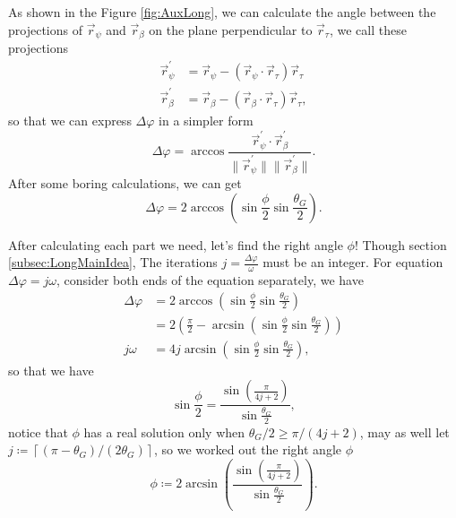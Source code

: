 \documentclass[a4paper,10pt]{book}
\numberwithin{equation}{section}
\begin{document}
As shown in the Figure \ref{fig:AuxLong}, we can calculate the angle between the projections of $\vec{r}_{\psi}$ and $\vec{r}_{\beta}$ on the plane perpendicular to $\vec{r}_{\tau}$, we call these projections
\begin{equation}
    \begin{split}
        \vec{r}_{\psi}^{'}  & =\vec{r}_{\psi}-(\vec{r}_{\psi}\cdot\vec{r}_{\tau})\vec{r}_{\tau}    \\
        \vec{r}_{\beta}^{'} & =\vec{r}_{\beta}-(\vec{r}_{\beta}\cdot\vec{r}_{\tau})\vec{r}_{\tau},
    \end{split}
\end{equation}
so that we can express $\Delta\varphi$ in a simpler form
\begin{equation}
    \Delta\varphi=\arccos\frac{\vec{r}_{\psi}^{'}\cdot\vec{r}_{\beta}^{'}}{\|\vec{r}_{\psi}^{'}\|\|\vec{r}_{\beta}^{'}\|}.
\end{equation}
After some boring calculations, we can get
\begin{equation}
    \Delta\varphi=2\arccos(\sin\frac{\phi}{2}\sin\frac{\theta_{G}}{2}).
\end{equation}

After calculating each part we need, let's find the right angle $\phi$! Though section \ref{subsec:LongMainIdea}, The iterations $j=\frac{\Delta\varphi}{\omega}$ must be an integer. For equation $\Delta\varphi=j\omega$, consider both ends of the equation separately, we have
\begin{equation}
    \begin{split}
        \Delta\varphi & = 2\arccos(\sin\frac{\phi}{2}\sin\frac{\theta_{G}}{2})                            \\
                      & = 2\left(\frac{\pi}{2}-\arcsin(\sin\frac{\phi}{2}\sin\frac{\theta_{G}}{2})\right) \\
        j\omega       & = 4j\arcsin(\sin\frac{\phi}{2}\sin\frac{\theta_{G}}{2}),
    \end{split}
\end{equation}
so that we have
\begin{equation}
    \sin\frac{\phi}{2} = \frac{\sin\left(\frac{\pi}{4j+2}\right)}{\sin\frac{\theta_{G}}{2}},
\end{equation}
notice that $\phi$ has a real solution only when $\theta_{G}/2\geq\pi/(4j+2)$, may as well let $j\coloneqq\left\lceil(\pi-\theta_{G})/(2\theta_{G}) \right\rceil$, so we worked out the right angle $\phi$
\begin{equation}
    \phi\coloneqq 2\arcsin\left(\frac{\sin\left(\frac{\pi}{4j+2}\right)}{\sin\frac{\theta_{G}}{2}}\right).
\end{equation}
\end{document}

